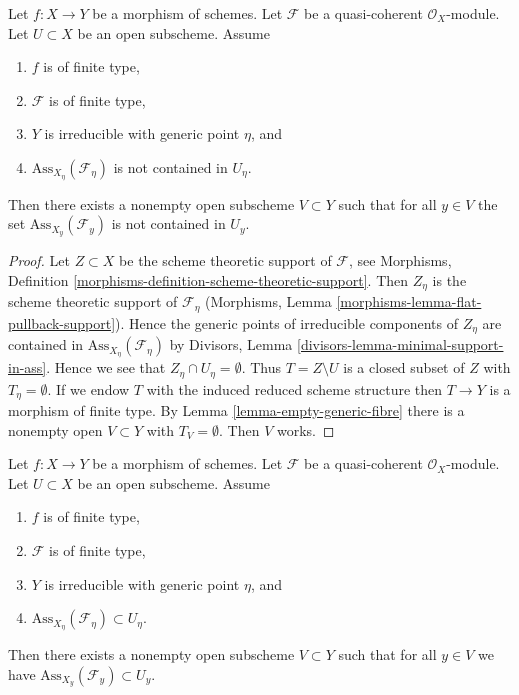 \begin{lemma}
\label{lemma-bad-case}
Let $f : X \to Y$ be a morphism of schemes. Let $\mathcal{F}$ be a
quasi-coherent $\mathcal{O}_X$-module. Let $U \subset X$ be an open
subscheme. Assume
\begin{enumerate}
\item $f$ is of finite type,
\item $\mathcal{F}$ is of finite type,
\item $Y$ is irreducible with generic point $\eta$, and
\item $\text{Ass}_{X_\eta}(\mathcal{F}_\eta)$ is not contained in $U_\eta$.
\end{enumerate}
Then there exists a nonempty open subscheme $V \subset Y$ such that
for all $y \in V$ the set $\text{Ass}_{X_y}(\mathcal{F}_y)$ is not
contained in $U_y$.
\end{lemma}

\begin{proof}
Let $Z \subset X$ be the scheme theoretic support of $\mathcal{F}$, see
Morphisms, Definition \ref{morphisms-definition-scheme-theoretic-support}.
Then $Z_\eta$ is the scheme theoretic support of $\mathcal{F}_\eta$
(Morphisms, Lemma \ref{morphisms-lemma-flat-pullback-support}).
Hence the generic points of irreducible components of $Z_\eta$
are contained in $\text{Ass}_{X_\eta}(\mathcal{F}_\eta)$ by
Divisors, Lemma \ref{divisors-lemma-minimal-support-in-ass}.
Hence we see that $Z_\eta \cap U_\eta = \emptyset$.
Thus $T = Z \setminus U$ is a closed subset of $Z$ with $T_\eta = \emptyset$.
If we endow $T$ with the induced reduced scheme structure then
$T \to Y$ is a morphism of finite type. By
Lemma \ref{lemma-empty-generic-fibre}
there is a nonempty open $V \subset Y$ with $T_V = \emptyset$.
Then $V$ works.
\end{proof}

\begin{lemma}
\label{lemma-good-case}
Let $f : X \to Y$ be a morphism of schemes. Let $\mathcal{F}$ be a
quasi-coherent $\mathcal{O}_X$-module. Let $U \subset X$ be an open
subscheme. Assume
\begin{enumerate}
\item $f$ is of finite type,
\item $\mathcal{F}$ is of finite type,
\item $Y$ is irreducible with generic point $\eta$, and
\item $\text{Ass}_{X_\eta}(\mathcal{F}_\eta) \subset U_\eta$.
\end{enumerate}
Then there exists a nonempty open subscheme $V \subset Y$ such that
for all $y \in V$ we have $\text{Ass}_{X_y}(\mathcal{F}_y) \subset U_y$.
\end{lemma}

